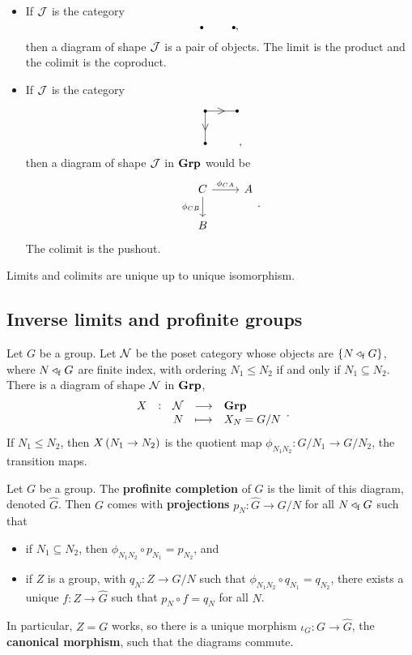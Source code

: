 \begin{example}
\hfill
\begin{itemize}
\item If $ \mathcal{J} $ is the category
$$
\begin{tikzpicture}
\fill (0, 0) circle (0.05);
\fill (1, 0) circle (0.05);
\end{tikzpicture},
$$
then a diagram of shape $ \mathcal{J} $ is a pair of objects. The limit is the product and the colimit is the coproduct.
\item If $ \mathcal{J} $ is the category
$$
\begin{tikzpicture}
\fill (0, 0) circle (0.05);
\fill (1, 0) circle (0.05);
\fill (0, -1) circle (0.05);
\draw (0, 0) to node{$ > $} (1, 0);
\draw (0, 0) to node{$ \vee $} (0, -1);
\end{tikzpicture},
$$
then a diagram of shape $ \mathcal{J} $ in $ \textbf{Grp} $ would be
$$
\begin{tikzcd}
C \arrow{r}{\phi_{CA}} \arrow{d}[swap]{\phi_{CB}} & A \\
B &
\end{tikzcd}.
$$
The colimit is the pushout.
\end{itemize}
\end{example}

\begin{proposition}
Limits and colimits are unique up to unique isomorphism.
\end{proposition}

\pagebreak

\subsection{Inverse limits and profinite groups}

Let $ G $ be a group. Let $ \mathcal{N} $ be the poset category whose objects are $ \cbr{N \triangleleft_\f G} $, where $ N \triangleleft_{\mathrm{f}} G $ are finite index, with ordering $ N_1 \le N_2 $ if and only if $ N_1 \subseteq N_2 $. There is a diagram of shape $ \mathcal{N} $ in $ \textbf{Grp} $,
$$ \function[X]{\NNN}{\Grp}{N}{X_N = G / N}. $$
If $ N_1 \le N_2 $, then $ X\br{N_1 \to N_2} $ is the quotient map $ \phi_{N_1N_2} : G / N_1 \to G / N_2 $, the transition maps.

\begin{definition}
Let $ G $ be a group. The \textbf{profinite completion} of $ G $ is the limit of this diagram, denoted $ \widehat{G} $. Then $ G $ comes with \textbf{projections} $ p_N : \widehat{G} \to G / N $ for all $ N \triangleleft_{\mathrm{f}} G $ such that
\begin{itemize}
\item if $ N_1 \subseteq N_2 $, then $ \phi_{N_1N_2} \circ p_{N_1} = p_{N_2} $, and
\item if $ Z $ is a group, with $ q_N : Z \to G / N $ such that $ \phi_{N_1N_2} \circ q_{N_1} = q_{N_2} $, there exists a unique $ f : Z \to \widehat{G} $ such that $ p_N \circ f = q_N $ for all $ N $.
\end{itemize}
In particular, $ Z = G $ works, so there is a unique morphism $ \iota_G : G \to \widehat{G} $, the \textbf{canonical morphism}, such that the diagrams commute.
\end{definition}

